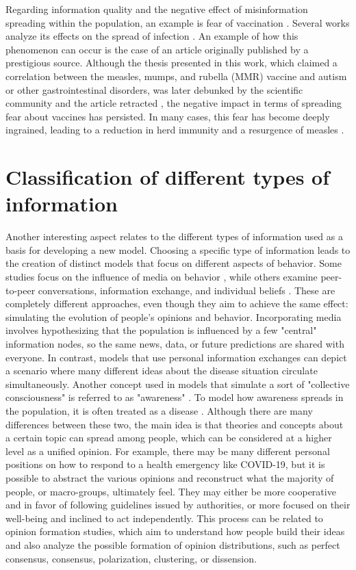 Regarding information quality and the negative effect of misinformation spreading within the population, an example is fear of vaccination \cite{Kahan_2013}. Several works analyze its effects on the spread of infection \cite{Bauch_2012_game, Epstein_2021}.
An example of how this phenomenon can occur is the case of an article originally published by a prestigious source. Although the thesis presented in this work, which claimed a correlation between the measles, mumps, and rubella (MMR) vaccine and autism or other gastrointestinal disorders, was later debunked by the scientific community and the article retracted \cite{wakefield1998retracted}, the negative impact in terms of spreading fear about vaccines has persisted. In many cases, this fear has become deeply ingrained, leading to a reduction in herd immunity and a resurgence of measles \cite{Bauch_2012_overview}.

\section{Classification of different types of information}
Another interesting aspect relates to the different types of information used as a basis for developing a new model. Choosing a specific type of information leads to the creation of distinct models that focus on different aspects of behavior. Some studies focus on the influence of media on behavior \cite{Collinson2014, Misra_2011}, while others examine peer-to-peer conversations, information exchange, and individual beliefs \cite{Tyson_2020}. These are completely different approaches, even though they aim to achieve the same effect: simulating the evolution of people's opinions and behavior. Incorporating media involves hypothesizing that the population is influenced by a few "central" information nodes, so the same news, data, or future predictions are shared with everyone. In contrast, models that use personal information exchanges can depict a scenario where many different ideas about the disease situation circulate simultaneously.
Another concept used in models that simulate a sort of "collective consciousness" is referred to as "awareness" \cite{Funk2009}. To model how awareness spreads in the population, it is often treated as a disease \cite{Silva2019, Granell2013, Granell_2014, Kabir_2019, Zuo_2021, Wang_2019}. Although there are many differences between these two, the main idea is that theories and concepts about a certain topic can spread among people, which can be considered at a higher level as a unified opinion. For example, there may be many different personal positions on how to respond to a health emergency like COVID-19, but it is possible to abstract the various opinions and reconstruct what the majority of people, or macro-groups, ultimately feel. They may either be more cooperative and in favor of following guidelines issued by authorities, or more focused on their well-being and inclined to act independently.
This process can be related to opinion formation studies, which aim to understand how people build their ideas \cite{Devia_2023, Devia2022} and also analyze the possible formation of opinion distributions, such as perfect consensus, consensus, polarization, clustering, or dissension.

